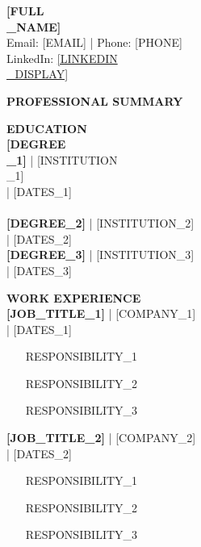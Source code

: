 \documentclass[11pt,a4paper]{article}
\begin{document}
\begin{center}
    \textbf{\Large [FULL\\_NAME]}\\
    Email: [EMAIL] | Phone: [PHONE]\\
    LinkedIn: \href{[LINKEDIN\\_URL]}{[LINKEDIN\\_DISPLAY]}\\
    [ADDITIONAL\_LINKS]
\end{center}

\vspace{6pt}

\textbf{\large PROFESSIONAL SUMMARY}\\
[SUMMARY\_TEXT]

\vspace{6pt}

\textbf{\large EDUCATION}\\
\textbf{[DEGREE\\_1]} | [INSTITUTION\\_1]\\
[LOCATION\_1] | [DATES\_1]\\
[DETAILS\_1]\\

\textbf{[DEGREE\_2]} | [INSTITUTION\_2]\\
[LOCATION\_2] | [DATES\_2]\\

\textbf{[DEGREE\_3]} | [INSTITUTION\_3]\\
[LOCATION\_3] | [DATES\_3]\\

\vspace{6pt}

\textbf{\large WORK EXPERIENCE}\\
\textbf{[JOB_TITLE\_1]} | [COMPANY\_1]\\
[LOCATION\_1] | [DATES\_1]\\
\begin{itemize}[leftmargin=*,noitemsep,topsep=2pt]
    \item [RESPONSIBILITY\_1]
    \item [RESPONSIBILITY\_2]
    \item [RESPONSIBILITY\_3]
\end{itemize}

\textbf{[JOB_TITLE\_2]} | [COMPANY\_2]\\
[LOCATION\_2] | [DATES\_2]\\
\begin{itemize}[leftmargin=*,noitemsep,topsep=2pt]
    \item [RESPONSIBILITY\_1]
    \item [RESPONSIBILITY\_2]
    \item [RESPONSIBILITY\_3]
\end{itemize}
\end{document}
